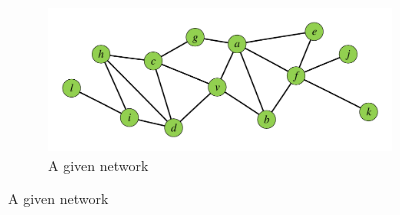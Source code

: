 \begin{figure}[t!]
        \captionsetup[subfigure]{aboveskip=-2.2pt, belowskip=-1.2pt}
        \centering
        \begin{subfigure}[b]{0.80\textwidth}
                \includegraphics[width=\textwidth]{./images/figs-original.pdf}
                \caption{A given network}
                \label{fig:1-a}
        \end{subfigure}
        

\end{figure}

